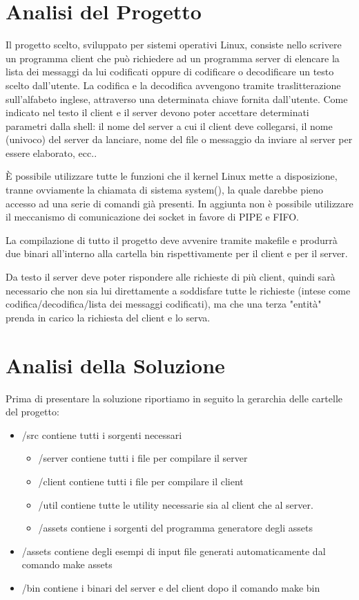 \documentclass[12pt]{article}
\begin{document}


\section{Analisi del Progetto}
Il progetto scelto, sviluppato per sistemi operativi Linux, consiste nello scrivere un programma client che può richiedere ad un programma server di elencare la lista dei messaggi da lui codificati oppure di codificare o decodificare un testo scelto dall'utente. La codifica e la decodifica avvengono tramite traslitterazione sull'alfabeto inglese, attraverso una determinata chiave fornita dall'utente. Come indicato nel testo il client e il server devono poter accettare determinati parametri dalla shell: il nome del server a cui il client deve collegarsi, il nome (univoco) del server da lanciare, nome del file o messaggio da inviare al server per essere elaborato, ecc..

È possibile utilizzare tutte le funzioni che il kernel Linux mette a disposizione, tranne ovviamente la chiamata di sistema system(), la quale darebbe pieno accesso ad una serie di comandi già presenti. In aggiunta non è possibile utilizzare il meccanismo di comunicazione dei socket in favore di PIPE e FIFO.

La compilazione di tutto il progetto deve avvenire tramite makefile e produrrà due binari all'interno alla cartella bin rispettivamente per il client e per il server.

Da testo il server deve poter rispondere alle richieste di più client, quindi sarà necessario che non sia lui direttamente a soddisfare tutte le richieste (intese come codifica/decodifica/lista dei messaggi codificati), ma che una terza "entità" prenda in carico la richiesta del client e lo serva.
\vspace*{0,5cm}

\section{Analisi della Soluzione}
Prima di presentare la soluzione riportiamo in seguito la gerarchia delle cartelle del progetto:
\begin{itemize}
    \item /src contiene tutti i sorgenti necessari
    \begin{itemize}
        \item /server contiene tutti i file per compilare il server
        \item /client contiene tutti i file per compilare il client
        \item /util contiene tutte le utility necessarie sia al client che al server.
        \item /assets contiene i sorgenti del programma generatore degli assets
    \end{itemize}
    \item /assets contiene degli esempi di input file generati automaticamente dal comando make assets
    \item /bin contiene i binari del server e del client dopo il comando make bin
\end{itemize}
\end{document}

